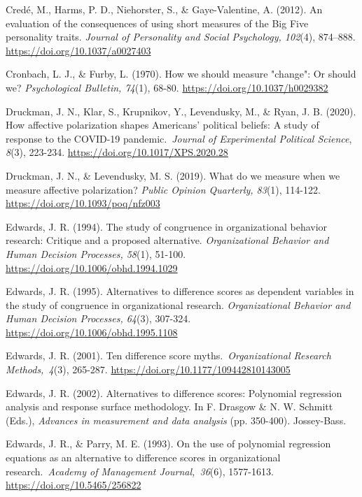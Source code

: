 \documentclass[authordate, meta]{jote-new-article}
\begin{document}
	Credé, M., Harms, P. D., Niehorster, S., \& Gaye-Valentine, A. (2012). An evaluation of the consequences of using short measures of the Big Five personality traits. \emph{Journal of Personality and Social Psychology, 102}(4), 874--888. \url{https://doi.org/10.1037/a0027403}



	Cronbach, L. J., \& Furby, L. (1970). How we should measure "change": Or should we? \emph{Psychological Bulletin, 74}(1), 68-80. \url{https://doi.org/10.1037/h0029382}



	Druckman, J. N., Klar, S., Krupnikov, Y., Levendusky, M., \& Ryan, J. B. (2020). How affective polarization shapes Americans' political beliefs: A study of response to the COVID-19 pandemic. \emph{Journal of Experimental Political Science}, \emph{8}(3), 223-234. \url{https://doi.org/10.1017/XPS.2020.28}


	Druckman, J. N., \& Levendusky, M. S. (2019). What do we measure when we measure affective polarization? \emph{Public Opinion Quarterly, 83}(1), 114-122. \url{https://doi.org/10.1093/poq/nfz003}



	Edwards, J. R. (1994). The study of congruence in organizational behavior research: Critique and a proposed alternative. \emph{Organizational Behavior and Human Decision Processes, 58}(1), 51-100. \url{https://doi.org/10.1006/obhd.1994.1029}



	Edwards, J. R. (1995). Alternatives to difference scores as dependent variables in the study of congruence in organizational research. \emph{Organizational Behavior and Human Decision Processes, 64}(3), 307-324. \url{https://doi.org/10.1006/obhd.1995.1108}



	Edwards, J. R. (2001). Ten difference score myths.\emph{ Organizational Research Methods, 4}(3), 265-287. \url{https://doi.org/10.1177/109442810143005}



	Edwards, J. R. (2002). Alternatives to difference scores: Polynomial regression analysis and response surface methodology. In F. Drasgow \& N. W. Schmitt (Eds.), \emph{Advances in measurement and data analysis} (pp. 350-400). Jossey-Bass.



	Edwards, J. R., \& Parry, M. E. (1993). On the use of polynomial regression equations as an alternative to difference scores in organizational research.\emph{ Academy of Management Journal, 36}(6), 1577-1613. \url{https://doi.org/10.5465/256822}
\end{document}

